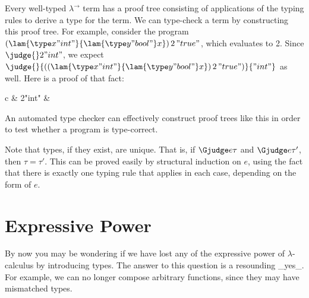 Every well-typed $\lambda^\to$ term has a proof tree consisting of applications of the typing rules to derive a type for the term. We can type-check a term by constructing this proof tree. For example, consider the program $(\lam{\type x{"int"}}{\lam{\type y{"bool"}}x})\,2\,"true"$, which evaluates to 2. Since $\judge{}2{"int"}$, we expect $\judge{}{((\lam{\type x{"int"}}{\lam{\type y{"bool"}}x})\,2\,"true")}{"int"}$ as well. Here is a proof of that fact:
\begin{center}
\begin{tabular}{c}
   {
       {
          {
              {}}
      & {\judge{}2{"int"}}}
  & {}}
\end{tabular}
\end{center}

An automated type checker can effectively construct proof trees like this in order to test whether a program is type-correct.

Note that types, if they exist, are unique. That is, if $\Gjudge e\tau$ and $\Gjudge e{\tau'}$, then $\tau=\tau'$. This can be proved easily by structural induction on $e$, using the fact that there is exactly one typing rule that applies in each case, depending on the form of $e$.

\section{Expressive Power}

By now you may be wondering if we have lost any of the expressive power
of $\lambda$-calculus by introducing types. The answer to this
question is a resounding _yes_. For example, we can no longer compose
arbitrary functions, since they may have mismatched types.

